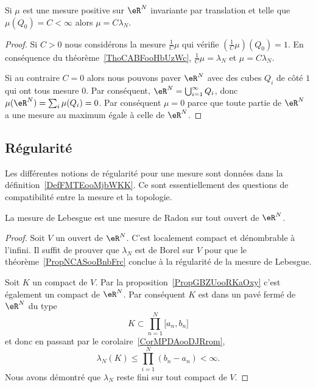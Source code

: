 \begin{corollary}       \label{CorKGMRooHWOQGP}
    Si \( \mu\) est une mesure positive sur \( \eR^N\) invariante par translation et telle que \( \mu(Q_0)=C<\infty\) alors \( \mu=C\lambda_N\).
\end{corollary}

\begin{proof}
    Si \( C>0\) nous considérons la mesure \( \frac{1}{ C }\mu\) qui vérifie \( (\frac{1}{ C }\mu)(Q_0)=1\). En conséquence du théorème~\ref{ThoCABFooHbUzWc}, \( \frac{1}{ C }\mu=\lambda_N\) et \( \mu=C\lambda_N\).

    Si au contraire \( C=0\) alors nous pouvons paver \( \eR^N\) avec des cubes \( Q_i\) de côté \( 1\) qui ont tous mesure \( 0\). Par conséquent, \( \eR^N=\bigcup_{i=1}^{\infty}Q_i\), donc \( \mu(\eR^N)=\sum_i\mu(Q_i)=0\). Par conséquent \( \mu=0\) parce que toute partie de \( \eR^N\) a une mesure au maximum égale à celle de \( \eR^N\).
\end{proof}

\subsection{Régularité}

Les différentes notions de régularité pour une mesure sont données dans la définition~\ref{DefFMTEooMjbWKK}. Ce sont essentiellement des questions de compatibilité entre la mesure et la topologie.
\begin{proposition}
    La mesure de Lebesgue est une mesure de Radon sur tout ouvert de \( \eR^N\).
\end{proposition}

\begin{proof}
    Soit \( V\) un ouvert de \( \eR^N\). C'est localement compact et dénombrable à l'infini. Il suffit de prouver que \( \lambda_N\) est de Borel sur \( V\) pour que le théorème~\ref{PropNCASooBnbFrc} conclue à la régularité de la mesure de Lebesgue.

    Soit \( K\) un compact de \( V\). Par la proposition~\ref{PropGBZUooRKaOxy} c'est également un compact de \( \eR^N\). Par conséquent \( K\) est dans un pavé fermé de \( \eR^N\) du type
    \begin{equation}
        K\subset \prod_{n=1}^N\mathopen[ a_n , b_n \mathclose]
    \end{equation}
    et donc en passant par le corolaire~\ref{CorMPDAooDJRrom},
    \begin{equation}
        \lambda_N(K)\leq \prod_{i=1}^N(b_n-a_n)<\infty.
    \end{equation}
    Nous avons démontré que \( \lambda_N\) reste fini sur tout compact de \( V\).
\end{proof}
